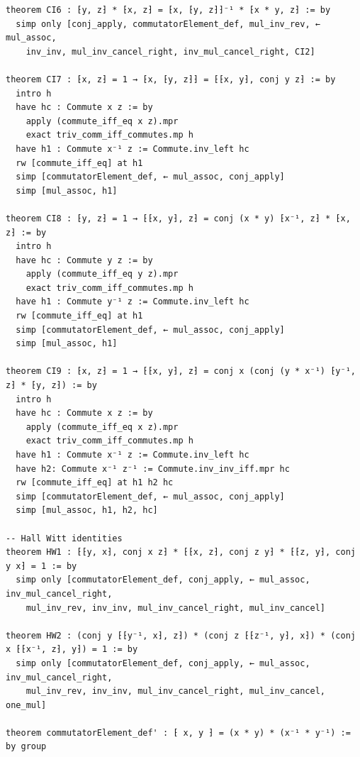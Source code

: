\begin{Verbatim}
theorem CI6 : ⁅y, z⁆ * ⁅x, z⁆ = ⁅x, ⁅y, z⁆⁆⁻¹ * ⁅x * y, z⁆ := by
  simp only [conj_apply, commutatorElement_def, mul_inv_rev, ← mul_assoc,
    inv_inv, mul_inv_cancel_right, inv_mul_cancel_right, CI2]

theorem CI7 : ⁅x, z⁆ = 1 → ⁅x, ⁅y, z⁆⁆ = ⁅⁅x, y⁆, conj y z⁆ := by
  intro h
  have hc : Commute x z := by
    apply (commute_iff_eq x z).mpr
    exact triv_comm_iff_commutes.mp h
  have h1 : Commute x⁻¹ z := Commute.inv_left hc
  rw [commute_iff_eq] at h1
  simp [commutatorElement_def, ← mul_assoc, conj_apply]
  simp [mul_assoc, h1]

theorem CI8 : ⁅y, z⁆ = 1 → ⁅⁅x, y⁆, z⁆ = conj (x * y) ⁅x⁻¹, z⁆ * ⁅x, z⁆ := by
  intro h
  have hc : Commute y z := by
    apply (commute_iff_eq y z).mpr
    exact triv_comm_iff_commutes.mp h
  have h1 : Commute y⁻¹ z := Commute.inv_left hc
  rw [commute_iff_eq] at h1
  simp [commutatorElement_def, ← mul_assoc, conj_apply]
  simp [mul_assoc, h1]

theorem CI9 : ⁅x, z⁆ = 1 → ⁅⁅x, y⁆, z⁆ = conj x (conj (y * x⁻¹) ⁅y⁻¹, z⁆ * ⁅y, z⁆) := by
  intro h
  have hc : Commute x z := by
    apply (commute_iff_eq x z).mpr
    exact triv_comm_iff_commutes.mp h
  have h1 : Commute x⁻¹ z := Commute.inv_left hc
  have h2: Commute x⁻¹ z⁻¹ := Commute.inv_inv_iff.mpr hc
  rw [commute_iff_eq] at h1 h2 hc
  simp [commutatorElement_def, ← mul_assoc, conj_apply]
  simp [mul_assoc, h1, h2, hc]

-- Hall Witt identities
theorem HW1 : ⁅⁅y, x⁆, conj x z⁆ * ⁅⁅x, z⁆, conj z y⁆ * ⁅⁅z, y⁆, conj y x⁆ = 1 := by
  simp only [commutatorElement_def, conj_apply, ← mul_assoc, inv_mul_cancel_right,
    mul_inv_rev, inv_inv, mul_inv_cancel_right, mul_inv_cancel]

theorem HW2 : (conj y ⁅⁅y⁻¹, x⁆, z⁆) * (conj z ⁅⁅z⁻¹, y⁆, x⁆) * (conj x ⁅⁅x⁻¹, z⁆, y⁆) = 1 := by
  simp only [commutatorElement_def, conj_apply, ← mul_assoc, inv_mul_cancel_right,
    mul_inv_rev, inv_inv, mul_inv_cancel_right, mul_inv_cancel, one_mul]

theorem commutatorElement_def' : ⁅ x, y ⁆ = (x * y) * (x⁻¹ * y⁻¹) := by group
\end{Verbatim}
